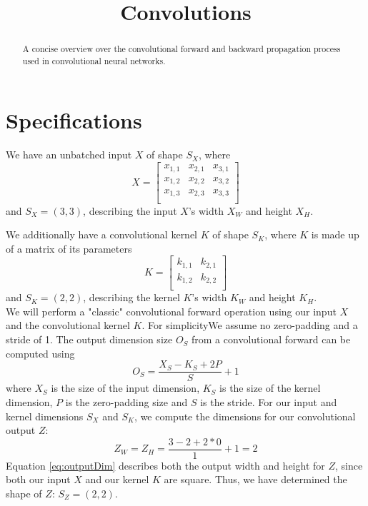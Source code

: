 \documentclass[english,notitlepage,reprint]{revtex4-1}
\begin{document}
\title{Convolutions}

\begin{abstract}
  A concise overview over the convolutional forward and backward propagation process used in convolutional neural networks.
\end{abstract}
\maketitle

\section{Specifications}
We have an unbatched input $X$ of shape $S_X$, where
$$
X= 
\begin{bmatrix} 
  x_{1,1} & x_{2,1} & x_{3,1}\\
  x_{1,2} & x_{2,2} & x_{3,2}\\
  x_{1,3} & x_{2,3} & x_{3,3}\\
\end{bmatrix}
$$
and $S_X=(3,3)$, describing the input $X$'s width $X_W$ and height $X_H$.

We additionally have a convolutional kernel $K$ of shape $S_K$, where $K$ is made up of a matrix of its parameters
$$
K= 
\begin{bmatrix} 
  k_{1,1} & k_{2,1}\\
  k_{1,2} & k_{2,2}\\
\end{bmatrix}
$$
and $S_K=(2,2)$, describing the kernel $K$'s width $K_W$ and height $K_H$.\\

We will perform a "classic" convolutional forward operation using our input $X$ and the convolutional kernel $K$. 
For simplicityWe assume no zero-padding and a stride of 1.
The output dimension size $O_S$ from a convolutional forward can be computed using
\begin{equation}
  O_S=\frac{X_S-K_S+2P}{S}+1
\end{equation}
where $X_S$ is the size of the input dimension, $K_S$ is the size of the kernel dimension, $P$ is the zero-padding size and $S$ is the stride. 
For our input and kernel dimensions $S_X$ and $S_K$, we compute the dimensions for our convolutional output $Z$:
\begin{equation}\label{eq:outputDim}
  Z_W=Z_H=\frac{3-2+2*0}{1}+1=2
\end{equation}
Equation \ref{eq:outputDim} describes both the output width and height for $Z$, since both our input $X$ and our kernel $K$ are square.
Thus, we have determined the shape of $Z$: $S_Z=(2,2)$.\\
\end{document}
